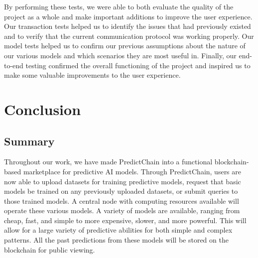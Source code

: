 \documentclass{ledger}
\begin{document}
By performing these tests, we were able to both evaluate the quality of the project as a whole and make important additions to improve the user experience.  Our transaction tests helped us to identify the issues that had previously existed and to verify that the current communication protocol was working properly.  Our model tests helped us to confirm our previous assumptions about the nature of our various models and which scenarios they are most useful in.  Finally, our end-to-end testing confirmed the overall functioning of the project and inspired us to make some valuable improvements to the user experience.

\section{Conclusion}

\subsection{Summary}

Throughout our work, we have made PredictChain into a functional blockchain-based marketplace for predictive AI models.
Through PredictChain, users are now able to upload datasets for training predictive models, request that basic models be trained on any previously uploaded datasets, or submit queries to those trained models. A central node with computing resources available will operate these various models. A variety of
models are available, ranging from cheap, fast, and simple to more expensive, slower, and more powerful. This will allow for a large variety of predictive abilities for both simple and complex patterns.  All the past predictions from these models will be stored on the blockchain for public viewing.

%
%
%
\end{document}
